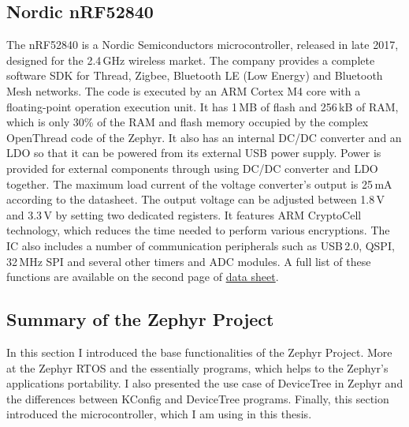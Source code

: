 \subsection{Nordic nRF52840}
The nRF52840 is a Nordic Semiconductors microcontroller, released in late 2017, designed for the 2.4\,\si{\giga\hertz} wireless market. The company provides a complete software SDK for Thread, Zigbee, Bluetooth LE (Low Energy) and Bluetooth Mesh networks. The code is executed by an ARM Cortex M4 core with a floating-point operation execution unit. It has 1\,\si{\mega B} of flash and 256\,\si{\kilo B} of RAM, which is only 30\% of the RAM and flash memory occupied by the complex OpenThread code of the Zephyr. It also has an internal DC/DC converter and an LDO so that it can be powered from its external USB power supply. Power is provided for external components through using DC/DC converter and LDO together. The maximum load current of the voltage converter's output is 25\,\si{\milli\ampere} according to the datasheet. The output voltage can be adjusted between 1.8\,\si{\volt} and 3.3\,\si{\volt} by setting two dedicated registers. It features ARM CryptoCell technology, which reduces the time needed to perform various encryptions. The IC also includes a number of communication peripherals such as USB\,2.0, QSPI, 32\,\si{\mega\hertz} SPI and several other timers and ADC modules. A full list of these functions are available on the second page of \href{https://infocenter.nordicsemi.com/pdf/nRF52840_PS_v1.1.pdf}{data sheet}\cite{NRFDATASHEET}.

\subsection{Summary of the Zephyr Project}
In this section I introduced the base functionalities of the Zephyr Project. More at the Zephyr RTOS and the essentially programs, which helps to the Zephyr's applications portability. I also presented the use case of DeviceTree in Zephyr and the differences between KConfig and DeviceTree programs. Finally, this section introduced the microcontroller, which I am using in this thesis. 